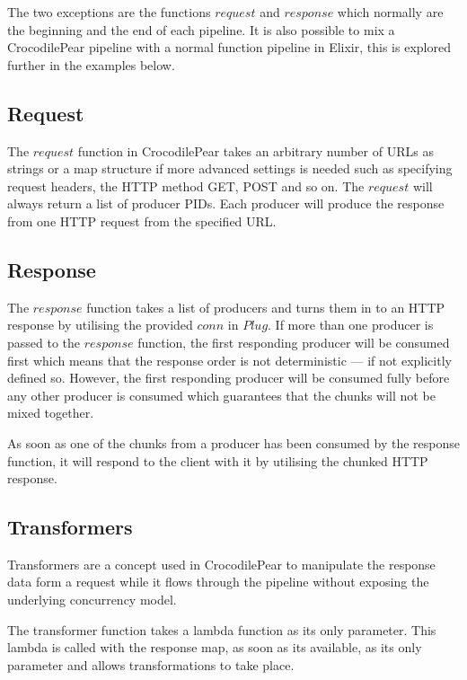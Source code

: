 \documentclass{cslthse-msc}
\begin{document}
The two exceptions are the functions $request$ and $response$ which normally are the beginning and the end of each pipeline. It is also possible to mix a CrocodilePear pipeline with a normal function pipeline in Elixir, this is explored further in the examples below.

\subsection{Request}
The $request$ function in CrocodilePear takes an arbitrary number of URLs as strings or a map structure if more advanced settings is needed such as specifying request headers, the HTTP method GET, POST and so on. The $request$ will always return a list of producer PIDs. Each producer will produce the response from one HTTP request from the specified URL.

\subsection{Response}
The $response$ function takes a list of producers and turns them in to an HTTP response by utilising the provided $conn$ in $Plug$. If more than one producer is passed to the $response$ function, the first responding producer will be consumed first which means that the response order is not deterministic --- if not explicitly defined so. However, the first responding producer will be consumed fully before any other producer is consumed which guarantees that the chunks will not be mixed together.

As soon as one of the chunks from a producer has been consumed by the response function, it will respond to the client with it by utilising the chunked HTTP response.

\subsection{Transformers}
Transformers are a concept used in CrocodilePear to manipulate the response data form a request while it flows through the pipeline without exposing the underlying concurrency model.

The transformer function takes a lambda function as its only parameter. This lambda is called with the response map, as soon as its available, as its only parameter and allows transformations to take place.
\end{document}
